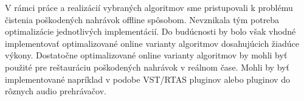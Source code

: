 V rámci práce a realizácií vybraných algoritmov sme pristupovali k problému čistenia poškodených nahrávok offline spôsobom. Nevznikala tým potreba optimalizácie jednotlivých implementácií. Do budúcnosti by bolo však vhodné implementovať optimalizované online varianty algoritmov dosahujúcich žiadúce výkony. Dostatočne optimalizované online varianty algoritmov by mohli byť použité pre reštauráciu poškodených nahrávok v reálnom čase. Mohli by byť implementované napríklad v podobe VST/RTAS pluginov alebo pluginov do rôznych audio prehrávačov.


